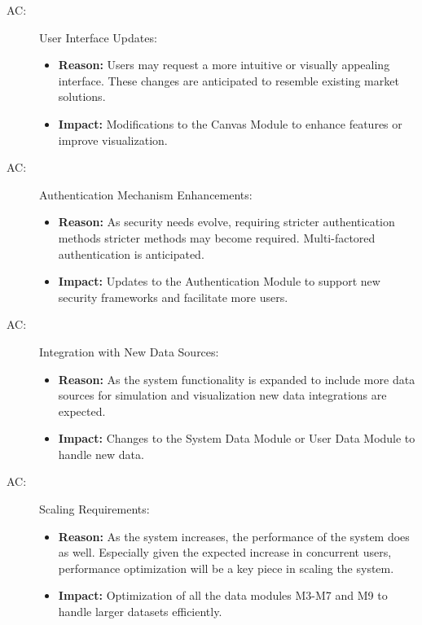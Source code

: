 \documentclass[12pt, titlepage]{article}
\newcounter{acnum}
\newcommand{\actheacnum}{AC\theacnum}
\begin{document}
\begin{description}


    \item [ \actheacnum \label{acUserInterface}:]User Interface Updates:
    \begin{itemize}
        \item \textbf{Reason:} Users may request a more intuitive or visually appealing interface. These changes are anticipated to resemble existing market solutions.
        \item \textbf{Impact:} Modifications to the Canvas Module to enhance features or improve visualization.
    \end{itemize}

    \item [ \actheacnum \label{acAuth}:]Authentication Mechanism Enhancements:
    \begin{itemize}
        \item \textbf{Reason:} As security needs evolve, requiring stricter authentication methods stricter methods may become required. Multi-factored authentication is anticipated.
        \item \textbf{Impact:} Updates to the Authentication Module to support new security frameworks and facilitate more users. 
    \end{itemize}

    \item [ \actheacnum \label{acAuth}:] Integration with New Data Sources:
    \begin{itemize}
        \item \textbf{Reason:} As the system functionality is expanded to include more data sources for simulation and visualization new data integrations are expected.
        
        \item \textbf{Impact:} Changes to the System Data Module or User Data Module to handle new data. 
    \end{itemize}

    \item  [ \actheacnum \label{acAuth}:]Scaling Requirements:
    \begin{itemize}
        \item \textbf{Reason:} As the system increases, the performance of the system does as well. Especially given the expected increase in concurrent users, performance optimization will be a key piece in scaling the system.
        \item \textbf{Impact:} Optimization of all the data modules M3-M7 and M9 to handle larger datasets efficiently.
    \end{itemize}



\end{description}
\end{document}
